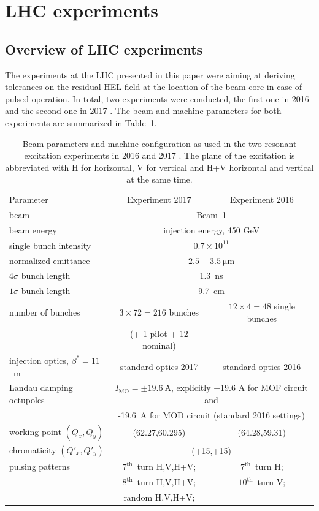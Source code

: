 \documentclass[%
 reprint,
 amsmath,amssymb,
 aps,
prstab,
]{revtex4-1}
\begin{document}
\section{LHC experiments\label{sec:exp}}
\subsection{Overview of LHC experiments\label{sec:exp_sum}}
The experiments at the LHC presented in this paper were aiming at deriving tolerances on the residual HEL field at the location of the beam core in case of pulsed operation. In total, two experiments were conducted, the first one in 2016 \cite{resexmd2016} and the second one in 2017 \cite{resexmd2017}. The beam and machine parameters for both experiments are summarized in Table~\ref{tab:md_param}.
\begin{table}
	\caption{\label{tab:md_param}%
		Beam parameters and machine configuration as used in the two resonant excitation experiments in 2016 and 2017 \cite{resexmd2016,resexmd2017}. The plane of the excitation is abbreviated with H for horizontal, V for vertical and H+V horizontal and vertical at the same time.
	}
	\begin{ruledtabular}
		\begin{tabular}{lcc}
			Parameter & Experiment 2017 & Experiment 2016  \\
			\colrule
			beam &\multicolumn{2}{c}{Beam~1} \\
			beam energy &\multicolumn{2}{c}{injection energy, 450 GeV} \\\hline
			single bunch intensity &\multicolumn{2}{c}{$0.7\times10^{11}$} \\
			normalized emittance &\multicolumn{2}{c}{$2.5-3.5~\mathrm{\mu m}$} \\
			$4\sigma$ bunch length & \multicolumn{2}{c}{1.3~ns}\\
			$1\sigma$ bunch length & \multicolumn{2}{c}{9.7~cm}\\
			number of bunches & $3\times72=216$ bunches & $12\times4=48$ single bunches\\
			& (+ 1 pilot + 12 nominal) & \\\hline
			injection optics, $\beta^*=11$~m & standard optics 2017 & standard optics 2016\\
			Landau damping octupoles  & \multicolumn{2}{c}{$I_{\mathrm{MO}}=\pm19.6~\mathrm{A}$, explicitly +19.6 A for MOF circuit and}\\
			& \multicolumn{2}{c}{-19.6~A for MOD circuit (standard 2016 settings)}\\\hline
			working point $(Q_x,Q_y)$ & (62.27,60.295) & (64.28,59.31)\\
			chromaticity $(Q'_x,Q'_y)$ & \multicolumn{2}{c}{(+15,+15)}\\\hline
			pulsing patterns  & $7^{\mathrm{th}}$~turn H,V,H+V;& $7^{\mathrm{th}}$~turn H;\\
			& $8^{\mathrm{th}}$~turn H,V,H+V;& $10^{\mathrm{th}}$~turn V;\\
			& random  H,V,H+V;& \\
		\end{tabular}
	\end{ruledtabular}
\end{table}
\end{document}
